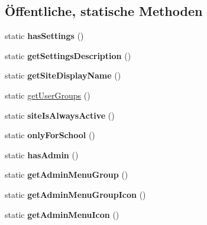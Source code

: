 \subsection*{Öffentliche, statische Methoden}
\begin{DoxyCompactItemize}
\item 
\mbox{\label{classklassentagebuch_a2478233315a9b977b1566ac28878d958}} 
static {\bfseries has\+Settings} ()
\item 
\mbox{\label{classklassentagebuch_a595698957798659ddd2f4e84c8c79724}} 
static {\bfseries get\+Settings\+Description} ()
\item 
\mbox{\label{classklassentagebuch_ac3fe6c45d35ce7f8944023652c69c235}} 
static {\bfseries get\+Site\+Display\+Name} ()
\item 
static \mbox{\hyperlink{classklassentagebuch_ab896bf20c10c99bffd5e1f559d29e00b}{get\+User\+Groups}} ()
\item 
\mbox{\label{classklassentagebuch_a276585c7398e9f6981090fbe382bdcce}} 
static {\bfseries site\+Is\+Always\+Active} ()
\item 
\mbox{\label{classklassentagebuch_a7a651725d1abb1465d211f43b87c150d}} 
static {\bfseries only\+For\+School} ()
\item 
\mbox{\label{classklassentagebuch_ac0aad5a8b24b137faf265ee570fc3a7c}} 
static {\bfseries has\+Admin} ()
\item 
\mbox{\label{classklassentagebuch_a7b0502c6ba06cf5a125a1a7c96ea236f}} 
static {\bfseries get\+Admin\+Menu\+Group} ()
\item 
\mbox{\label{classklassentagebuch_aa2297b997bd3dbd1bc51c8ead5c930ad}} 
static {\bfseries get\+Admin\+Menu\+Group\+Icon} ()
\item 
\mbox{\label{classklassentagebuch_a5981e96bde8914ec82dbdea181cf8a41}} 
static {\bfseries get\+Admin\+Menu\+Icon} ()
\item 
\mbox{\label{classklassentagebuch_a0fbe67d2b145d1fbaf91639977edee50}} 

\end{DoxyCompactItemize}
